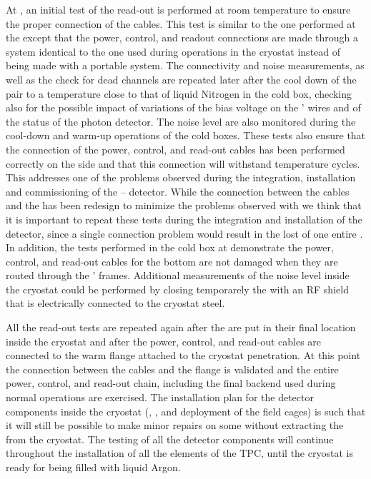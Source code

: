 At \surf, an initial test of the read-out is performed at room temperature to
ensure the proper connection of the cables. This test is similar to the one
performed at the  except that the power, control, and readout
connections are made through a system identical to the one used during
operations in the cryostat instead of being made with a portable system.
The connectivity and noise measurements, as well as the check for dead
channels are repeated later after the cool down of the  pair
to a temperature close to that of liquid Nitrogen in the cold box, 
checking also for the possible impact of variations of the bias voltage
on the ' wires and of the status of the photon detector.
The noise level are also monitored during the cool-down and warm-up 
operations of the cold boxes. These tests also ensure that the connection
of the power, control, and read-out cables has been performed correctly
on the  side and that this connection will withstand temperature 
cycles. This addresses one of the problems observed during the integration,
installation and commissioning of the -- 
detector. While the connection between the cables and the 
has been redesign to minimize the problems observed with 
we think that it is important to repeat these tests during the integration
and installation of the detector, since a single connection problem would
result in the lost of one entire . In addition, the tests 
performed in the cold box at \surf demonstrate the power, control, and read-out
cables for the bottom  are not damaged when they are routed 
through the ' frames. Additional measurements of the noise
level inside the cryostat could be performed by closing temporarely the
 with an RF shield that is electrically connected to the
cryostat steel.

All the read-out tests are repeated again after the  are put
in their final location inside the cryostat and after the power, control, and
read-out cables are connected to the warm flange attached to the cryostat
penetration. At this point the connection between the cables and the flange
is validated and the entire power, control, and read-out chain, including the
final  backend used during normal operations are exercised. The
installation plan for the detector components inside the cryostat (,
, and deployment of the field cages) is such that it will still
be possible to make minor repairs on some  without extracting
the  from the cryostat. The testing of all the detector components
will continue throughout the installation of all the elements of the TPC, 
until the cryostat is ready for being filled with liquid Argon.

